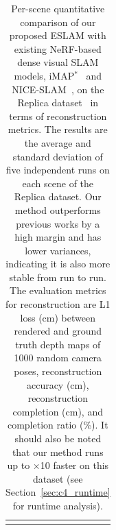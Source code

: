 \begin{table}[t]
\begin{center}
\begin{tabular}{l|l|cccc}
            \Xhline{2\arrayrulewidth}
            \end{tabular}
    \end{center}
    \caption{Per-scene quantitative comparison of our proposed ESLAM with existing NeRF-based dense visual SLAM models, iMAP$^{*}$~\citep{sucar2021imap} and NICE-SLAM~\citep{zhu2022nice}, on the Replica dataset~\citep{replica19arxiv} in terms of reconstruction metrics. The results are the average and standard deviation of five independent runs on each scene of the Replica dataset. Our method outperforms previous works by a high margin and has lower variances, indicating it is also more stable from run to run. The evaluation metrics for reconstruction are L1 loss (cm) between rendered and ground truth depth maps of 1000 random camera poses, reconstruction accuracy (cm), reconstruction completion (cm), and completion ratio (\%). It should also be noted that our method runs up to $\times$10 faster on this dataset (see Section~\ref{sec:c4_runtime} for runtime analysis).}
    \label{table:per_scene_reconstruction}
\end{table}

